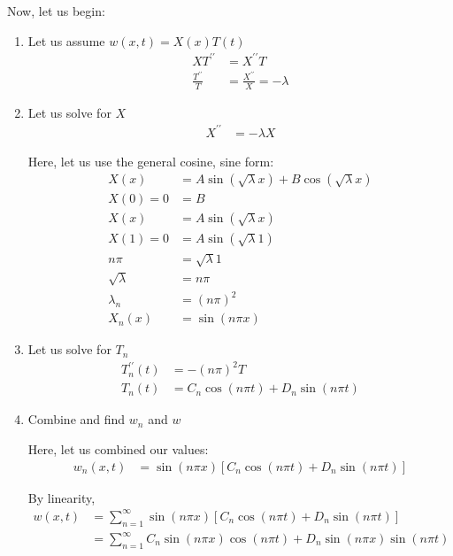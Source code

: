 Now, let us begin:
%
\begin{enumerate}
  \item Let us assume $w(x, t) = X(x)T(t)$
  \begin{align}
    XT^{\prime\prime} & = X^{\prime\prime}T\\
    \frac{T^{\prime\prime}}{T} & = \frac{X^{\prime\prime}}{X} = - \lambda
  \end{align}

  \item Let us solve for $X$
  \begin{align}
    X^{\prime\prime} & = - \lambda X
  \end{align}

  Here, let us use the general cosine, sine form:
  \begin{align}
    X(x) & = A \sin \left(\sqrt \lambda x \right) + B \cos \left(\sqrt \lambda x \right)\\
    X(0) = 0 & = B\\
    X(x) & = A \sin \left( \sqrt \lambda x \right)\\
    X(1) = 0 & = A \sin \left( \sqrt \lambda 1 \right)\\
    n \pi & = \sqrt \lambda 1\\
    \sqrt \lambda & = n \pi\\
    \lambda_n & = (n \pi)^2\\
    X_n(x) & = \sin(n \pi x)
  \end{align}

  \item Let us solve for $T_n$
  \begin{align}
    T^{\prime\prime}_n(t) & = - (n \pi)^2T\\
    T_n(t) & = C_n \cos(n \pi t) + D_n \sin(n \pi t)
  \end{align}

  \item Combine and find $w_n$ and $w$

  Here, let us combined our values:
  \begin{align}
    w_n(x, t) & = \sin(n \pi x)\left[ C_n \cos(n \pi t) + D_n \sin(n \pi t) \right]
  \end{align}

  By linearity,
  \begin{align}
    w(x, t) & = \sum^\infty_{n = 1}
    \sin(n \pi x)\left[ C_n \cos(n \pi t) + D_n \sin(n \pi t) \right]\\
    & = \sum^\infty_{n = 1}
    C_n \sin(n \pi x) \cos(n \pi t) + D_n \sin(n \pi x) \sin(n \pi t)
  \end{align}


\end{enumerate}
